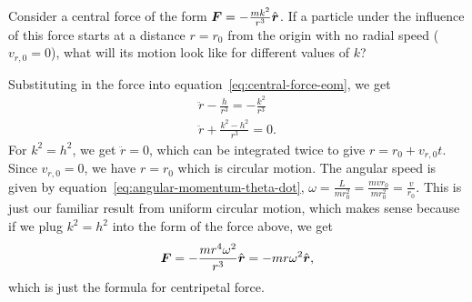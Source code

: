 \documentclass[../classical_mechanics.tex]{subfiles}
\begin{document}
        \begin{example}
            Consider a central force of the form $\boldsymbol{F}=-\frac{mk^2}{r^3}\hat{\boldsymbol{r}}$.
            If a particle under the influence of this force starts at a distance $r=r_0$ from the origin with no radial speed ($v_{r,0}=0$), what will its motion look like for different values of $k$?

            Substituting in the force into equation~\ref{eq:central-force-eom}, we get
            \begin{gather}
                \ddot{r}-\frac{h}{r^3}=-\frac{k^2}{r^3}\\
                \ddot{r}+\frac{k^2-h^2}{r^3}=0.
            \end{gather}
            For $k^2=h^2$, we get $\ddot{r}=0$, which can be integrated twice to give $r=r_0+v_{r,0}t$.
            Since $v_{r,0}=0$, we have $r=r_0$ which is circular motion.
            The angular speed is given by equation~\ref{eq:angular-momentum-theta-dot}, $\omega=\frac{L}{mr_0^2}=\frac{mvr_0}{mr_0^2}=\frac{v}{r_0}$.
            This is just our familiar result from uniform circular motion, which makes sense because if we plug $k^2=h^2$ into the form of the force above, we get
            \begin{equation}
                \boldsymbol{F}=-\frac{mr^4\omega^2}{r^3}\hat{\boldsymbol{r}}=-mr\omega^2\hat{\boldsymbol{r}},
            \end{equation}
            which is just the formula for centripetal force.


\end{example}
\end{document}
